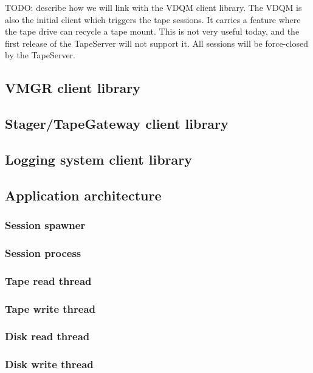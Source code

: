 TODO: describe how we will link with the VDQM client library. The VDQM is also 
the initial client which triggers the tape sessions. It carries a feature
where the tape drive can recycle a tape mount. This is not very useful today,
and the first release of the TapeServer will not support it. All sessions
will be force-closed by the TapeServer.

\subsection{VMGR client library}

\subsection{Stager/TapeGateway client library}

\subsection{Logging system client library}

\subsection{Application architecture}

\subsubsection{Session spawner}

\subsubsection{Session process}

\subsubsection{Tape read thread}

\subsubsection{Tape write thread}

\subsubsection{Disk read thread}

\subsubsection{Disk write thread}


